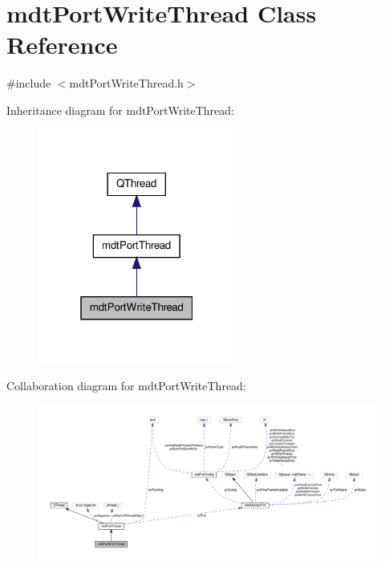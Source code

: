 \hypertarget{classmdt_port_write_thread}{\section{mdt\-Port\-Write\-Thread Class Reference}
\label{classmdt_port_write_thread}
}


{\ttfamily \#include $<$mdt\-Port\-Write\-Thread.\-h$>$}



Inheritance diagram for mdt\-Port\-Write\-Thread\-:\nopagebreak
\begin{figure}[H]
\begin{center}
\leavevmode
\includegraphics[width=184pt]{classmdt_port_write_thread__inherit__graph}
\end{center}
\end{figure}


Collaboration diagram for mdt\-Port\-Write\-Thread\-:
\nopagebreak
\begin{figure}[H]
\begin{center}
\leavevmode
\includegraphics[width=350pt]{classmdt_port_write_thread__coll__graph}
\end{center}
\end{figure}
